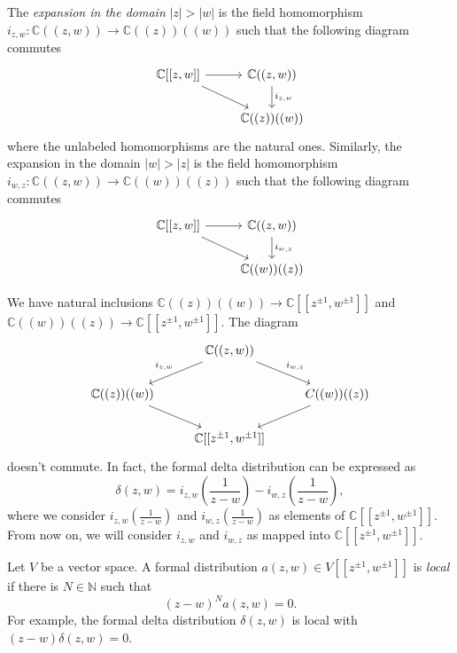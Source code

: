 \documentclass[a4paper, 12pt, reqno]{amsart}
\theoremstyle{remark}
\numberwithin{equation}{subsection}
\begin{document}
The \emph{expansion in the domain} $|z| > |w|$ is the field homomorphism $i_{z, w}: \mathbb{C}((z, w)) \to \mathbb{C}((z))((w))$ such that the following diagram commutes
\begin{equation*}
  \begin{tikzcd}
    {\mathbb{C}[[z, w]]} \arrow[rd] \arrow[r] & {\mathbb{C}((z, w))} \arrow[d, "{i_{z, w}}"] \\
    & \mathbb{C}((z))((w))
  \end{tikzcd}
\end{equation*}
where the unlabeled homomorphisms are the natural ones.
Similarly, the expansion in the domain $|w| > |z|$ is the field homomorphism $i_{w, z}: \mathbb{C}((z, w)) \to \mathbb{C}((w))((z))$ such that the following diagram commutes
\begin{equation*}
  \begin{tikzcd}
    {\mathbb{C}[[z, w]]} \arrow[rd] \arrow[r] & {\mathbb{C}((z, w))} \arrow[d, "{i_{w, z}}"] \\
    & \mathbb{C}((w))((z))
  \end{tikzcd}
\end{equation*}

We have natural inclusions $\mathbb{C}((z))((w)) \to \mathbb{C}[[z^{\pm 1}, w^{\pm 1}]]$ and $\mathbb{C}((w))((z)) \to \mathbb{C}[[z^{\pm 1}, w^{\pm 1}]]$.
The diagram
\begin{equation*}
  \begin{tikzcd}
    & {\mathbb{C}((z, w))} \arrow[ld, "{i_{z,w}}"'] \arrow[rd, "{i_{w,z}}"] &\\
    \mathbb{C}((z))((w)) \arrow[rd] && {C}((w))((z)) \arrow[ld] \\
    & {\mathbb{C}[[z^{\pm 1}, w^{\pm 1}]]} &
  \end{tikzcd}
\end{equation*}
doesn't commute.
In fact, the formal delta distribution can be expressed as
\begin{equation*}
  \delta(z, w) = i_{z, w}\left(\frac{1}{z - w}\right) - i_{w, z}\left(\frac{1}{z - w}\right),
\end{equation*}
where we consider $i_{z, w}(\frac{1}{z - w})$ and $i_{w, z}(\frac{1}{z - w})$ as elements of $\mathbb{C}[[z^{\pm 1}, w^{\pm 1}]]$.
From now on, we will consider $i_{z, w}$ and $i_{w, z}$ as mapped into $\mathbb{C}[[z^{\pm 1}, w^{\pm 1}]]$.

Let $V$ be a vector space.
A formal distribution $a(z, w) \in V[[z^{\pm 1}, w^{\pm 1}]]$ is \emph{local} if there is $N \in \mathbb{N}$ such that
\begin{equation*}
  (z - w)^Na(z, w)=0.
\end{equation*}
For example, the formal delta distribution $\delta(z, w)$ is local with $(z - w)\delta(z, w) = 0$.
\end{document}
